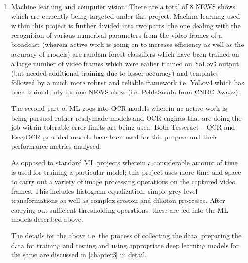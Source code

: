 \begin{enumerate}
  \item Machine learning and computer vision: There are a total of 8 NEWS shows which are currently being targeted under this project. Machine learning used within this project is further divided into two parts: the one dealing with the recognition of various numerical parameters from the video frames of a broadcast (wherein active work is going on to increase efficiency as well as the accuracy of models) are random forest classifiers which have been trained on a large number of video frames which were earlier trained on YoLov3 output (but needed additional training due to lesser accuracy) and templates followed by a much more robust and reliable framework i.e. YoLov4 which has been trained only for one NEWS show (i.e. PehlaSauda from CNBC Awaaz). \par

  The second part of ML goes into OCR models wherein no active work is being pursued rather readymade models and OCR engines that are doing the job within tolerable error limits are being used. Both Tesseract – OCR and EasyOCR provided models have been used for this purpose and their performance metrics analysed. \par

  As opposed to standard ML projects wherein a considerable amount of time is used for training a particular model; this project uses more time and space to carry out a variety of image processing operations on the captured video frames. This includes histogram equalization, simple grey level transformations as well as complex erosion and dilation processes. After carrying out sufficient thresholding operations, these are fed into the ML models described above.

  The details for the above i.e. the process of collecting the data, preparing the data for training and testing and using appropriate deep learning models for the same are discussed in \ref{chapter3} in detail.


\end{enumerate}
